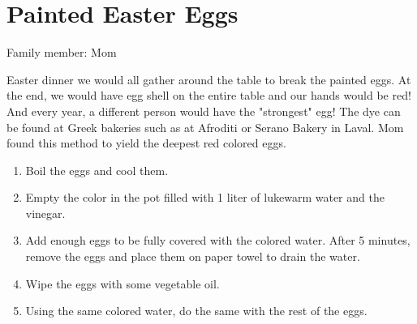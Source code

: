 \chapter{Painted Easter Eggs}
\label{ch:eastereggs}

Family member: Mom


 Easter dinner we would all gather around the table to break the painted eggs. At the end, we would have egg shell on the entire table and our hands would be red! And every year, a different person would have the "strongest" egg!     The dye can be found at Greek bakeries such as at Afroditi or Serano Bakery in Laval. Mom found this method to yield the deepest red colored eggs.

\begin{enumerate}
    \item Boil the eggs and cool them.
    \item Empty the color in the pot filled with 1 liter of lukewarm water and the vinegar.
    \item Add enough eggs to be fully covered with the colored water. After 5 minutes, remove the eggs and place them on paper towel to drain the water.
    \item Wipe the eggs with some vegetable oil.
    \item Using the same colored water, do the same with the rest of the eggs. 
\end{enumerate}

